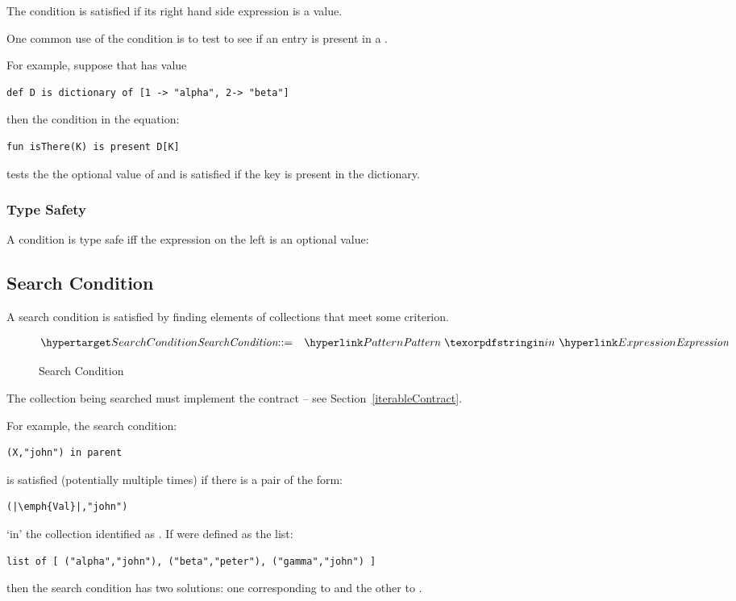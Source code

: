 The  condition is satisfied if its right hand side expression is a  value.

One common use of the  condition is to test to see if an entry is present in a .

For example, suppose that  has value
\begin{lstlisting}
def D is dictionary of [1 -> "alpha", 2-> "beta"]
\end{lstlisting}
then the condition in the equation:
\begin{lstlisting}
fun isThere(K) is present D[K]
\end{lstlisting}
tests the the optional value of  and is satisfied if the key  is present in the dictionary.

\subsubsection{Type Safety}
A  condition is type safe iff the expression on the left is an optional value:
\begin{prooftree}
\end{prooftree}

\subsection{Search Condition}
\label{searchCondition}
A search condition is satisfied by finding elements of collections that meet some criterion.

\begin{figure}[htbp]
\begin{eqnarray*}
\ntDef{SearchCondition}&\arrow&\ntRef{Pattern}\ \q{in}\ \ntRef{Expression}
\end{eqnarray*}
\caption{Search Condition}
\label{searchFormFig}
\end{figure}

\begin{aside}
The collection being searched must implement the  contract -- see Section~\vref{iterableContract}.
\end{aside}

For example, the search condition:
\begin{lstlisting}
(X,"john") in parent
\end{lstlisting}
is satisfied (potentially multiple times) if there is a pair of the form:
\begin{lstlisting}[escapechar=|]
(|\emph{Val}|,"john")
\end{lstlisting}
`in' the collection identified as . If  were defined as the list:
\begin{lstlisting}
list of [ ("alpha","john"), ("beta","peter"), ("gamma","john") ]
\end{lstlisting}
then the search condition has two solutions: one corresponding to  and the other to .


